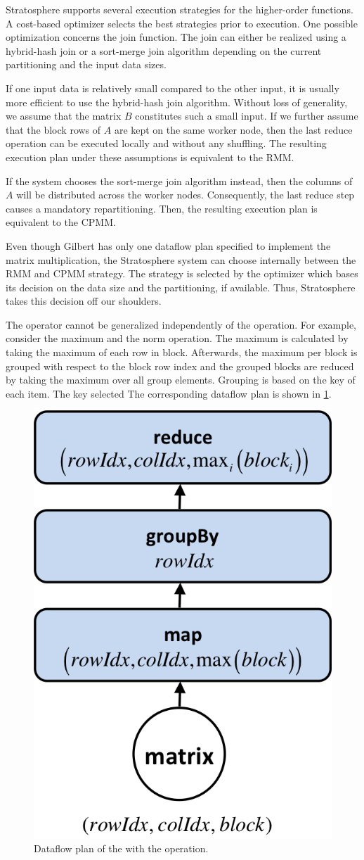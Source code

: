 Stratosphere supports several execution strategies for the higher-order functions.
A cost-based optimizer selects the best strategies prior to execution.
One possible optimization concerns the join function.
The join can either be realized using a hybrid-hash join or a sort-merge join algorithm depending on the current partitioning and the input data sizes.

If one input data is relatively small compared to the other input, it is usually more efficient to use the hybrid-hash join algorithm.
Without loss of generality, we assume that the matrix $B$ constitutes such a small input.
If we further assume that the block rows of $A$ are kept on the same worker node, then the last reduce operation can be executed locally and without any shuffling.
The resulting execution plan under these assumptions is equivalent to the RMM.

If the system chooses the sort-merge join algorithm instead, then the columns of $A$ will be distributed across the worker nodes.
Consequently, the last reduce step causes a mandatory repartitioning.
Then, the resulting execution plan is equivalent to the CPMM.

Even though Gilbert has only one dataflow plan specified to implement the matrix multiplication, the Stratosphere system can choose internally between the RMM and CPMM strategy.
The strategy is selected by the optimizer which bases its decision on the data size and the partitioning, if available.
Thus, Stratosphere takes this decision off our shoulders.

The  operator cannot be generalized independently of the  operation.
For example, consider the maximum and the norm operation.
The maximum is calculated by taking the maximum of each row in block.
Afterwards, the maximum per block is grouped with respect to the block row index and the grouped blocks are reduced by taking the maximum over all group elements.
Grouping is based on the key of each item.
The key selected
The corresponding dataflow plan is shown in \cref{fig:planMaximumVectorwiseTransformation}.

\begin{figure}[!h]
	\centering
	\includegraphics[width=0.3\linewidth]{images/planMaximumVectorwiseTransformation.png}
	\caption{Dataflow plan of the  with the  operation.}
	\label{fig:planMaximumVectorwiseTransformation}
\end{figure}

